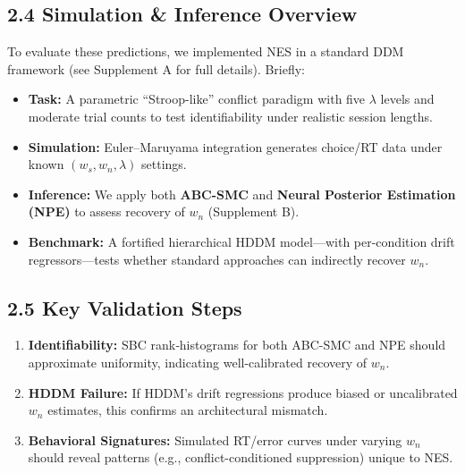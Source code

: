 \documentclass[
  11pt,
]{article}
\providecommand{\tightlist}{%
  \setlength{\itemsep}{0pt}\setlength{\parskip}{0pt}}
\begin{document}
\subsection{2.4 Simulation \& Inference
Overview}\label{simulation-inference-overview}

To evaluate these predictions, we implemented NES in a standard DDM
framework (see Supplement A for full details). Briefly:

\begin{itemize}
\tightlist
\item
  \textbf{Task:} A parametric ``Stroop-like'' conflict paradigm with
  five \(\lambda\) levels and moderate trial counts to test
  identifiability under realistic session lengths.\\
\item
  \textbf{Simulation:} Euler--Maruyama integration generates choice/RT
  data under known \((w_s,w_n,\lambda)\) settings.\\
\item
  \textbf{Inference:} We apply both \textbf{ABC-SMC} and \textbf{Neural
  Posterior Estimation (NPE)} to assess recovery of \(w_n\) (Supplement
  B).\\
\item
  \textbf{Benchmark:} A fortified hierarchical HDDM model---with
  per-condition drift regressors---tests whether standard approaches can
  indirectly recover \(w_n\).
\end{itemize}

\subsection{2.5 Key Validation Steps}\label{key-validation-steps}

\begin{enumerate}
\def\labelenumi{\arabic{enumi}.}
\tightlist
\item
  \textbf{Identifiability:} SBC rank‐histograms for both ABC-SMC and NPE
  should approximate uniformity, indicating well-calibrated recovery of
  \(w_n\).\\
\item
  \textbf{HDDM Failure:} If HDDM's drift regressions produce biased or
  uncalibrated \(w_n\) estimates, this confirms an architectural
  mismatch.\\
\item
  \textbf{Behavioral Signatures:} Simulated RT/error curves under
  varying \(w_n\) should reveal patterns (e.g., conflict-conditioned
  suppression) unique to NES.
\end{enumerate}
\end{document}
